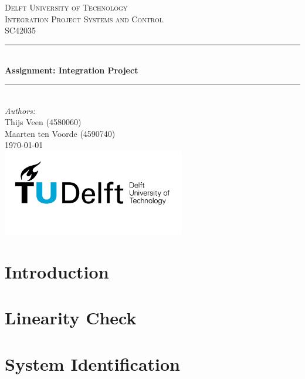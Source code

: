 \documentclass[a4paper]{article}
\begin{document}
\begin{titlepage}

\newcommand{\HRule}{\rule{\linewidth}{0.5mm}} 							%
\center 
 
\textsc{\LARGE Delft University of Technology}\\[1cm]

\textsc{\Large Integration Project Systems and Control}\\[0.2cm]
\textsc{\large SC42035}\\[1cm] 										%
\HRule \\[0.8cm]
{ \huge \bfseries Assignment: Integration Project}\\[0.7cm]								%
\HRule \\[2cm]
\large
\emph{Authors:}\\
Thijs Veen (4580060)\\
Maarten ten Voorde (4590740)\\[1.5cm]	%
{\large \today}\\[5cm]
\includegraphics[width=0.6\textwidth]{images/TU_delft_logo.jpg}\\[1cm] 	%
\vfill 
\end{titlepage}


\section{Introduction}
%
% 
\section{Linearity Check}
% 

\section{System Identification}
% 
% 
% 
% 
% 
\newpage
\end{document}
